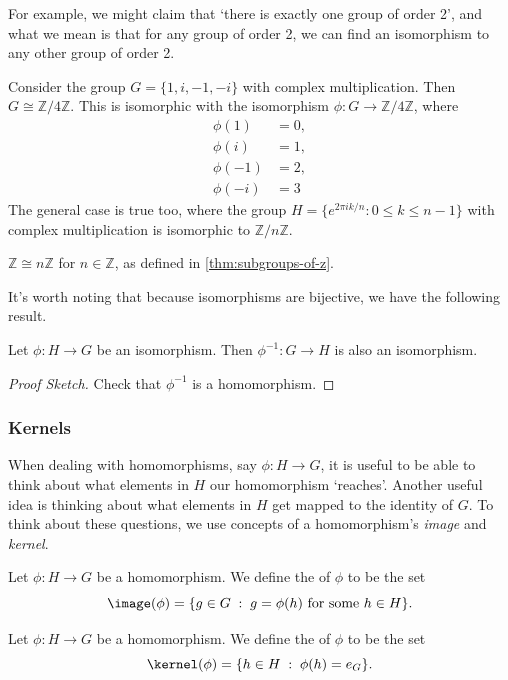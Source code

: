 \documentclass[a4paper]{scrartcl}
\begin{document}
For example, we might claim that `there is exactly one group of order 2', and what we mean is that for any group of order 2, we can find an isomorphism to any other group of order 2. 

\begin{example}
	Consider the group $G = \{ 1, i, -1, -i \}$ with complex multiplication. Then $G \cong \mathbb{Z} / 4 \mathbb{Z}$. This is isomorphic with the isomorphism $\phi : G \rightarrow \mathbb{Z} / 4 \mathbb{Z}$, where
	\begin{align*}
		\phi(1) &= 0, \\
		\phi(i) &= 1, \\
		\phi(-1) &= 2, \\
		\phi(-i) &= 3
	\end{align*}
	The general case is true too, where the group $H = \{  e^{2 \pi i k/n} : 0 \leq k \leq n - 1 \}$ with complex multiplication is isomorphic to $\mathbb{Z} /n \mathbb{Z}$.
\end{example}

\begin{example}
	$\mathbb{Z} \cong n \mathbb{Z}$ for $n \in \mathbb{Z}$, as defined in \autoref{thm:subgroups-of-z}. 
\end{example}

It's worth noting that because isomorphisms are bijective, we have the following result.

\begin{proposition}
	Let $\phi : H \rightarrow G$ be an isomorphism. Then $\phi^{-1} : G \rightarrow H$ is also an isomorphism.
\end{proposition}
\begin{proof}[Proof Sketch]
	Check that $\phi^{-1}$ is a homomorphism.
\end{proof}

\subsubsection{Kernels}

When dealing with homomorphisms, say $\phi : H \rightarrow G$, it is useful to be able to think about what elements in $H$ our homomorphism `reaches'.
Another useful idea is thinking about what elements in $H$ get mapped to the identity of $G$. To think about these questions, we use concepts of a homomorphism's \emph{image} and \emph{kernel}. 

\begin{definition}[Image]
	Let $\phi :H \rightarrow G$ be a homomorphism. We define the  of $\phi$ to be the set
	$$
	\image(\phi) = \{ g \in G \; : \; g = \phi(h) \text{ for some } h \in H  \}.
	$$
\end{definition}
\begin{definition}[Kernel]
	Let $\phi : H \rightarrow G$ be a homomorphism. We define the  of $\phi$ to be the set
	$$
	\kernel(\phi) = \{ h \in H \; : \; \phi(h) = e_G \}.
	$$
\end{definition}
\end{document}
